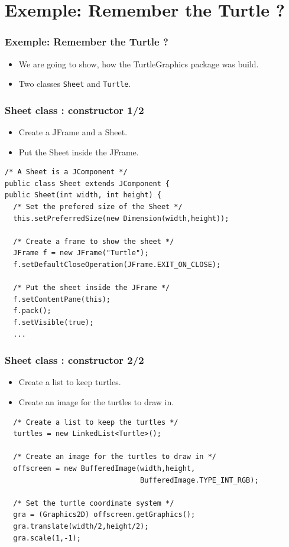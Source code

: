 \documentclass[10pt, handout]{beamer}
\begin{document}
\section{Exemple: Remember the Turtle ?}
\begin{frame}
  \frametitle{Exemple: Remember the Turtle ?}
  \begin{itemize}
  \item \alert{We are going to show, how the TurtleGraphics package was build.}
  \item Two classes \texttt{Sheet} and \texttt{Turtle}.
  \end{itemize}
\end{frame}

\begin{frame}[fragile]
  \frametitle{Sheet class : constructor 1/2}
  \begin{itemize}
    \item Create a JFrame and a Sheet.
    \item Put the Sheet inside the JFrame.
  \end{itemize}
\begin{verbatim}
/* A Sheet is a JComponent */
public class Sheet extends JComponent {
public Sheet(int width, int height) {
  /* Set the prefered size of the Sheet */
  this.setPreferredSize(new Dimension(width,height));

  /* Create a frame to show the sheet */
  JFrame f = new JFrame("Turtle");
  f.setDefaultCloseOperation(JFrame.EXIT_ON_CLOSE);

  /* Put the sheet inside the JFrame */
  f.setContentPane(this);
  f.pack();
  f.setVisible(true);
  ...
\end{verbatim}
\end{frame}

\begin{frame}[fragile]
  \frametitle{Sheet class : constructor 2/2}
  \begin{itemize}
    \item Create a list to keep turtles.
    \item Create an image for the turtles to draw in.
  \end{itemize}
\begin{verbatim}
  /* Create a list to keep the turtles */
  turtles = new LinkedList<Turtle>();

  /* Create an image for the turtles to draw in */
  offscreen = new BufferedImage(width,height,
                                BufferedImage.TYPE_INT_RGB);

  /* Set the turtle coordinate system */
  gra = (Graphics2D) offscreen.getGraphics();
  gra.translate(width/2,height/2);
  gra.scale(1,-1);
\end{verbatim}
\end{frame}
\end{document}

